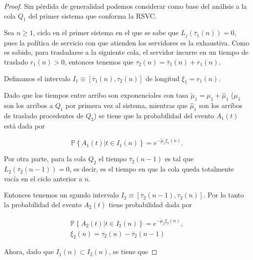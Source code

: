 \documentclass{article}
\newcommand{\prob}{\mathbb{P}}
\begin{document}
\begin{proof}
Sin p\'erdida de generalidad podemos considerar como base del an\'alisis a la cola $Q_{1}$ del primer sistema que conforma la RSVC.\medskip 

Sea $n\geq1$, ciclo en el primer sistema en el que se sabe que $L_{j}\left(\overline{\tau}_{1}\left(n\right)\right)=0$, pues la pol\'itica de servicio con que atienden los servidores es la exhaustiva. Como es sabido, para trasladarse a la siguiente cola, el servidor incurre en un tiempo de traslado $r_{1}\left(n\right)>0$, entonces tenemos que $\tau_{2}\left(n\right)=\overline{\tau}_{1}\left(n\right)+r_{1}\left(n\right)$.\medskip 


Definamos el intervalo $I_{1}\equiv\left[\overline{\tau}_{1}\left(n\right),\tau_{2}\left(n\right)\right]$ de longitud $\xi_{1}=r_{1}\left(n\right)$.

Dado que los tiempos entre arribo son exponenciales con tasa $\tilde{\mu}_{1}=\mu_{1}+\hat{\mu}_{1}$ ($\mu_{1}$ son los arribos a $Q_{1}$ por primera vez al sistema, mientras que $\hat{\mu}_{1}$ son los arribos de traslado procedentes de $Q_{3}$) se tiene que la probabilidad del evento $A_{1}\left(t\right)$ est\'a dada por 

\begin{equation}
\prob\left\{A_{1}\left(t\right)|t\in I_{1}\left(n\right)\right\}=e^{-\tilde{\mu}_{1}\xi_{1}\left(n\right)}.
\end{equation} 


Por otra parte, para la cola $Q_{2}$ el tiempo $\overline{\tau}_{2}\left(n-1\right)$ es tal que $L_{2}\left(\overline{\tau}_{2}\left(n-1\right)\right)=0$, es decir, es el tiempo en que la cola queda totalmente vac\'ia en el ciclo anterior a $n$. \medskip 


Entonces tenemos un sgundo intervalo $I_{2}\equiv\left[\overline{\tau}_{2}\left(n-1\right),\tau_{2}\left(n\right)\right]$. Por lo tanto la probabilidad del evento $A_{2}\left(t\right)$ tiene probabilidad dada por

\begin{eqnarray}
\prob\left\{A_{2}\left(t\right)|t\in I_{2}\left(n\right)\right\}=e^{-\tilde{\mu}_{2}\xi_{2}\left(n\right)},\\
\xi_{2}\left(n\right)=\tau_{2}\left(n\right)-\overline{\tau}_{2}\left(n-1\right)
\end{eqnarray}


Ahora, dado que $I_{1}\left(n\right)\subset I_{2}\left(n\right)$, se tiene que


\end{proof}
\end{document}
